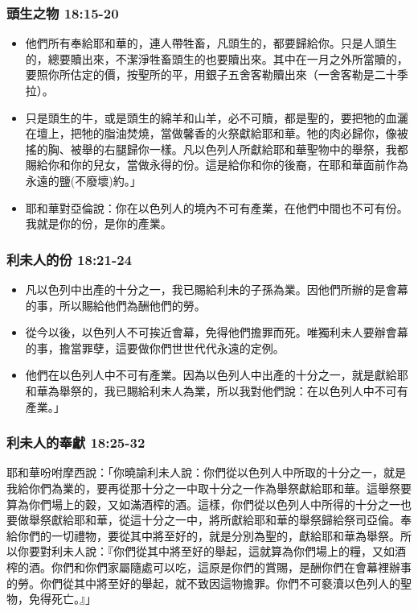 \subsubsection{頭生之物 18:15-20}
\begin{itemize} 
\itemsep-.25em  
\item 他們所有奉給耶和華的，連人帶牲畜，凡頭生的，都要歸給你。只是人頭生的，總要贖出來，不潔淨牲畜頭生的也要贖出來。其中在一月之外所當贖的，要照你所估定的價，按聖所的平，用銀子五舍客勒贖出來（一舍客勒是二十季拉）。 
\item 只是頭生的牛，或是頭生的綿羊和山羊，必不可贖，都是聖的，要把牠的血灑在壇上，把牠的脂油焚燒，當做馨香的火祭獻給耶和華。牠的肉必歸你，像被搖的胸、被舉的右腿歸你一樣。凡以色列人所獻給耶和華聖物中的舉祭，我都賜給你和你的兒女，當做永得的份。這是給你和你的後裔，在耶和華面前作為永遠的鹽(不廢壞)約。」
\item 耶和華對亞倫說：你在以色列人的境內不可有產業，在他們中間也不可有份。我就是你的份，是你的產業。
\end{itemize}

\subsubsection{利未人的份 18:21-24}
\begin{itemize} 
\itemsep-.25em  
\item 凡以色列中出產的十分之一，我已賜給利未的子孫為業。因他們所辦的是會幕的事，所以賜給他們為酬他們的勞。
\item 從今以後，以色列人不可挨近會幕，免得他們擔罪而死。唯獨利未人要辦會幕的事，擔當罪孽，這要做你們世世代代永遠的定例。
\item 他們在以色列人中不可有產業。因為以色列人中出產的十分之一，就是獻給耶和華為舉祭的，我已賜給利未人為業，所以我對他們說：在以色列人中不可有產業。」
\end{itemize}

\subsubsection{利未人的奉獻 18:25-32}
耶和華吩咐摩西說：「你曉諭利未人說：你們從以色列人中所取的十分之一，就是我給你們為業的，要再從那十分之一中取十分之一作為舉祭獻給耶和華。這舉祭要算為你們場上的穀，又如滿酒榨的酒。這樣，你們從以色列人中所得的十分之一也要做舉祭獻給耶和華，從這十分之一中，將所獻給耶和華的舉祭歸給祭司亞倫。奉給你們的一切禮物，要從其中將至好的，就是分別為聖的，獻給耶和華為舉祭。所以你要對利未人說：『你們從其中將至好的舉起，這就算為你們場上的糧，又如酒榨的酒。你們和你們家屬隨處可以吃，這原是你們的賞賜，是酬你們在會幕裡辦事的勞。你們從其中將至好的舉起，就不致因這物擔罪。你們不可褻瀆以色列人的聖物，免得死亡。』」

